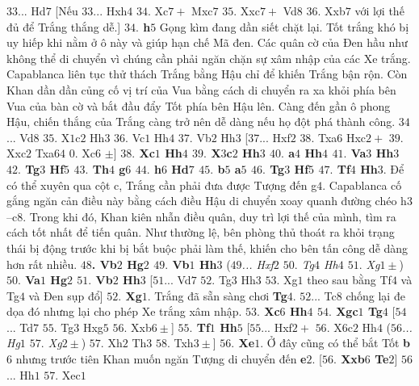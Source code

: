 \begin{multicols}{2}
	\vskip 0.1cm
	$33$... Hd$7$ 
	[Nếu $33$... Hxh$4$ $34.$ Xc$7+$ Mxc$7$ $35.$ Xxc$7+$ Vd$8$ $36.$ Xxb$7$ với lợi thế đủ để Trắng thắng dễ.]
	\vskip 0.1cm
	\textbf{\color{gocco}$34.$ h$5$} Gọng kìm đang dần siết chặt lại. Tốt trắng khó bị uy hiếp khi nằm ở ô này và giúp hạn chế Mã đen. Các quân cờ của Đen hầu như không thể di chuyển vì chúng cần phải ngăn chặn sự xâm nhập của các Xe trắng. Capablanca liên tục thử thách Trắng bằng Hậu chỉ để khiến Trắng bận rộn. Còn Khan dần dần củng cố vị trí của Vua bằng cách di chuyển ra xa khỏi phía bên Vua của bàn cờ và bắt đầu đẩy Tốt phía bên Hậu lên. Càng đến gần ô phong Hậu, chiến thắng của Trắng càng trở nên dễ dàng nếu họ đột phá thành công.
	\vskip 0.1cm
	$34$... Vd$8$ $35.$ X$1$c$2$ Hh$3$ $36.$ Vc$1$ Hh$4$ $37.$ Vb$2$ Hh$3$ 
	\vskip 0.1cm
	[$37$... Hxf$2$ $38.$ Txa$6$ Hxc$2+$ $39.$ Xxc$2$ Txa$64$ $0.$ Xc$6$ $\pm$]
	\vskip 0.1cm
	\textbf{\color{gocco}$38.$ Xc$1$ Hh$4$ $39.$ X$3$c$2$ Hh$3$ $40.$ a$4$ Hh$4$ $41.$ Va$3$ Hh$3$ $42.$ Tg$3$ Hf$5$ $43.$ Th$4$ g$6$ $44.$ h$6$ Hd$7$ $45.$ b$5$ a$5$ $46.$ Tg$3$ Hf$5$ $47.$ Tf$4$ Hh$3$}.
	\vskip 0.1cm
	Để có thể xuyên qua cột c, Trắng cần phải đưa được Tượng đến g$4$. Capablanca cố gắng ngăn cản điều này bằng cách điều Hậu di chuyển xoay quanh đường chéo h$3$--c$8$. Trong khi đó, Khan kiên nhẫn điều quân, duy trì lợi thế của mình, tìm ra cách tốt nhất để tiến quân. Như thường lệ, bên phòng thủ thoát ra khỏi trạng thái bị động trước khi bị bắt buộc phải làm thế, khiến cho bên tấn công dễ dàng hơn rất nhiều. \textbf{\color{gocco}$48$. Vb$2$ Hg$2$ $49.$ Vb$1$ Hh$3$}
	\vskip 0.1cm
	(\textit{$49$... Hxf$2$ $50.$ Tg$4$ Hh$4$ $51.$ Xg$1\pm$})
	\vskip 0.1cm
	\textbf{\color{gocco}$50.$ Va$1$ Hg$2$ $51.$ Vb$2$ Hh$3$}
	\vskip 0.1cm 
	[$51$... Vd$7$ $52.$ Tg$3$ Hh$3$ $53.$ Xg$1$ theo sau bằng Tf$4$ và Tg$4$ và Đen sụp đổ]
	\vskip 0.1cm
	\textbf{\color{gocco}$52.$ Xg$1$}. Trắng đã sẵn sàng chơi \textbf{\color{gocco}Tg$4$}. $52$... Tc$8$  chống lại đe dọa đó nhưng lại cho phép Xe trắng xâm nhập. \textbf{\color{gocco}$53.$ Xc$6$ Hh$4$ $54.$ Xgc$1$ Tg$4$}
	\vskip 0.1cm
	[$54$... Td$7$ $55.$ Tg$3$ Hxg$5$ $56.$ Xxb$6\pm$]
	\vskip 0.1cm
	\textbf{\color{gocco}$55.$ Tf$1$ Hh$5$}
	\vskip 0.1cm
	[$55$... Hxf$2+$ $56.$ X$6$c$2$ Hh$4$ (\textit{$56$... Hg$1$ $57.$ Xg$2\pm$}) $57.$ Xh$2$ Th$3$ $58.$ Txh$3\pm$]
	\vskip 0.1cm
	\textbf{\color{gocco}$56.$ Xe$1$}. Ở đây cũng có thể bắt Tốt \textbf{\color{gocco}b}$6$ nhưng trước tiên Khan muốn ngăn Tượng di chuyển đến \textbf{\color{gocco}e}$2$. 
	\vskip 0.1cm
	[\textbf{\color{gocco}$56.$ Xxb$6$ Te$2$}]
	\vskip 0.1cm
	$56$... Hh$1$ $57.$ Xec$1$
	\vskip 0.1cm

\end{multicols}
